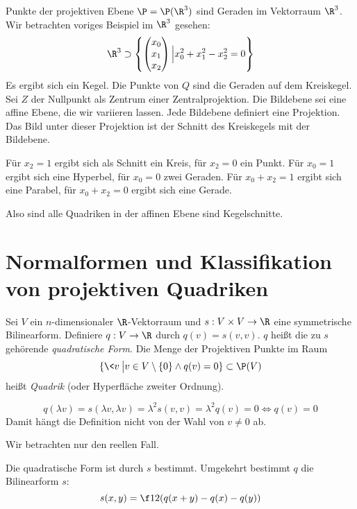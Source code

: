 \documentclass{mycourse}
\begin{document}
\begin{ex}
	Punkte der projektiven Ebene $\P=\P(\R^3)$ sind Geraden im Vektorraum $\R^3$.
	Wir betrachten voriges Beispiel im $\R^3$ gesehen:
	\[
		\R^3 \supset \left\{\begin{pmatrix}x_0\\x_1\\x_2\end{pmatrix}\Big| x_0^2+x_1^2-x_2^2=0\right\}
	\]
	Es ergibt sich ein Kegel.
	\fixme[Zeichnung]
	Die Punkte von $Q$ sind die Geraden auf dem Kreiskegel.
	Sei $Z$ der Nullpunkt als Zentrum einer Zentralprojektion.
	Die Bildebene sei eine affine Ebene, die wir variieren lassen.
	Jede Bildebene definiert eine Projektion.
	Das Bild unter dieser Projektion ist der Schnitt des Kreiskegels mit der Bildebene.
	
	Für $x_2=1$ ergibt sich als Schnitt ein Kreis, für $x_2=0$ ein Punkt.
	Für $x_0=1$ ergibt sich eine Hyperbel, für $x_0=0$ zwei Geraden.
	Für $x_0+x_2=1$ ergibt sich eine Parabel, für $x_0+x_2=0$ ergibt sich eine Gerade.

	Also sind alle Quadriken in der affinen Ebene sind Kegelschnitte.
\end{ex}


\section{Normalformen und Klassifikation von projektiven Quadriken}

\begin{df}
	\label{df:15.7}
	Sei $V$ ein $n$-dimensionaler $\R$-Vektorraum und $s:V\times V\to \R$ eine symmetrische Bilinearform.
	Definiere $q:V\to \R$ durch $q(v) = s(v,v)$.
	$q$ heißt die zu $s$ gehörende \emph{quadratische Form}.
	Die Menge der Projektiven Punkte im Raum
	\[
		\{ \<v\> \big| v\in V\setminus\{0\} \land q(v) = 0\} \subset \P(V)
	\]
	heißt \emph{Quadrik} (oder Hyperfläche zweiter Ordnung).
	\begin{note}
		\[
			q(\lambda v) = s(\lambda v, \lambda v) = \lambda^2 s(v,v) = \lambda^2 q(v) = 0 \iff q(v)=0
		\]
		Damit hängt die Definition nicht von der Wahl von $v\neq 0$ ab.

		Wir betrachten nur den reellen Fall.

		Die quadratische Form ist durch $s$ bestimmt.
		Umgekehrt bestimmt $q$ die Bilinearform $s$:
		\[
			s(x,y) = \f 12 (q(x+y) - q(x) -q(y))
		\]
	\end{note}
\end{df}
\end{document}
